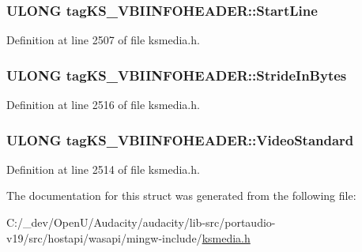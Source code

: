 \subsubsection[{\texorpdfstring{Start\+Line}{StartLine}}]{\setlength{\rightskip}{0pt plus 5cm}U\+L\+O\+NG tag\+K\+S\+\_\+\+V\+B\+I\+I\+N\+F\+O\+H\+E\+A\+D\+E\+R\+::\+Start\+Line}\hypertarget{structtag_k_s___v_b_i_i_n_f_o_h_e_a_d_e_r_af944118b4715d3a932fb00f199495b31}{}\label{structtag_k_s___v_b_i_i_n_f_o_h_e_a_d_e_r_af944118b4715d3a932fb00f199495b31}


Definition at line 2507 of file ksmedia.\+h.

\subsubsection[{\texorpdfstring{Stride\+In\+Bytes}{StrideInBytes}}]{\setlength{\rightskip}{0pt plus 5cm}U\+L\+O\+NG tag\+K\+S\+\_\+\+V\+B\+I\+I\+N\+F\+O\+H\+E\+A\+D\+E\+R\+::\+Stride\+In\+Bytes}\hypertarget{structtag_k_s___v_b_i_i_n_f_o_h_e_a_d_e_r_a12b3e9d6beb8fb299effa817517e3998}{}\label{structtag_k_s___v_b_i_i_n_f_o_h_e_a_d_e_r_a12b3e9d6beb8fb299effa817517e3998}


Definition at line 2516 of file ksmedia.\+h.

\subsubsection[{\texorpdfstring{Video\+Standard}{VideoStandard}}]{\setlength{\rightskip}{0pt plus 5cm}U\+L\+O\+NG tag\+K\+S\+\_\+\+V\+B\+I\+I\+N\+F\+O\+H\+E\+A\+D\+E\+R\+::\+Video\+Standard}\hypertarget{structtag_k_s___v_b_i_i_n_f_o_h_e_a_d_e_r_a08275832c5cc4c4ac64b356bc4629f1e}{}\label{structtag_k_s___v_b_i_i_n_f_o_h_e_a_d_e_r_a08275832c5cc4c4ac64b356bc4629f1e}


Definition at line 2514 of file ksmedia.\+h.



The documentation for this struct was generated from the following file\+:\begin{DoxyCompactItemize}
\item 
C\+:/\+\_\+dev/\+Open\+U/\+Audacity/audacity/lib-\/src/portaudio-\/v19/src/hostapi/wasapi/mingw-\/include/\hyperlink{ksmedia_8h}{ksmedia.\+h}\end{DoxyCompactItemize}
